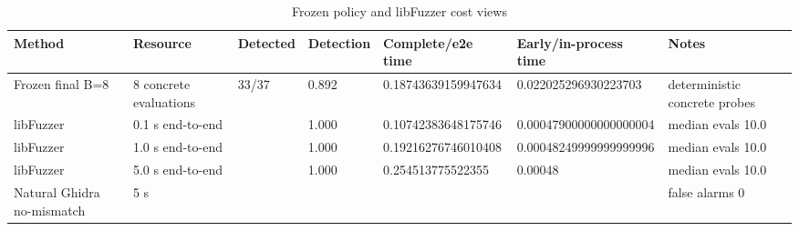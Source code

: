 \begin{table}[t]
\centering
\small
\begin{tabular}{lllllll}
\toprule
Method & Resource & Detected & Detection & Complete/e2e time & Early/in-process time & Notes \\
\midrule
Frozen final B=8 & 8 concrete evaluations & 33/37 & 0.892 & 0.18743639159947634 & 0.022025296930223703 & deterministic concrete probes \\
libFuzzer & 0.1 s end-to-end &  & 1.000 & 0.10742383648175746 & 0.00047900000000000004 & median evals 10.0 \\
libFuzzer & 1.0 s end-to-end &  & 1.000 & 0.19216276746010408 & 0.00048249999999999996 & median evals 10.0 \\
libFuzzer & 5.0 s end-to-end &  & 1.000 & 0.254513775522355 & 0.00048 & median evals 10.0 \\
Natural Ghidra no-mismatch & 5 s &  &  &  &  & false alarms 0 \\
\bottomrule
\end{tabular}
\caption{Frozen policy and libFuzzer cost views}
\end{table}
